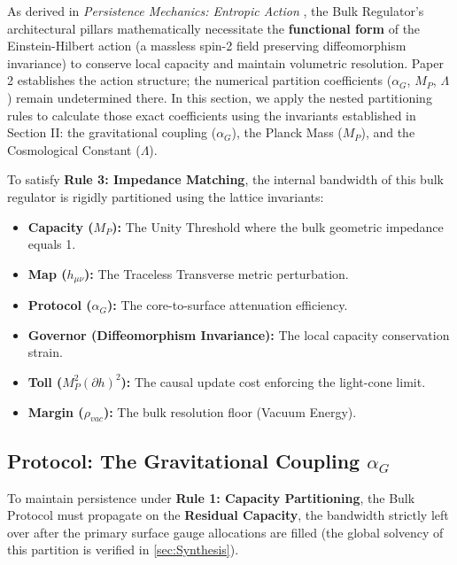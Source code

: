 As derived in \textit{Persistence Mechanics: Entropic Action} \cite{meyer_ieaction_2026}, the Bulk Regulator's architectural pillars mathematically necessitate the \textbf{functional form} of the Einstein-Hilbert action (a massless spin-2 field preserving diffeomorphism invariance) to conserve local capacity and maintain volumetric resolution. Paper 2 establishes the action structure; the numerical partition coefficients ($\alpha_G$, $M_P$, $\Lambda$) remain undetermined there. In this section, we apply the nested partitioning rules to calculate those exact coefficients using the invariants established in Section II: the gravitational coupling ($\alpha_G$), the Planck Mass ($M_P$), and the Cosmological Constant ($\Lambda$).

To satisfy \textbf{Rule 3: Impedance Matching}, the internal bandwidth of this bulk regulator is rigidly partitioned using the lattice invariants:

\begin{itemize}
    \item \textbf{Capacity ($M_P$):} The Unity Threshold where the bulk geometric impedance equals 1.
    \item \textbf{Map ($h_{\mu\nu}$):} The Traceless Transverse metric perturbation.
    \item \textbf{Protocol ($\alpha_G$):} The core-to-surface attenuation efficiency.
    \item \textbf{Governor (Diffeomorphism Invariance):} The local capacity conservation strain.
    \item \textbf{Toll ($M_P^2 (\partial h)^2$):} The causal update cost enforcing the light-cone limit.
    \item \textbf{Margin ($\rho_{vac}$):} The bulk resolution floor (Vacuum Energy).
\end{itemize}

\subsection{Protocol: The Gravitational Coupling \texorpdfstring{$\alpha_G$}{alphaG}}
To maintain persistence under \textbf{Rule 1: Capacity Partitioning}, the Bulk Protocol must propagate on the \textbf{Residual Capacity}, the bandwidth strictly left over after the primary surface gauge allocations are filled (the global solvency of this partition is verified in \cref{sec:Synthesis}).

